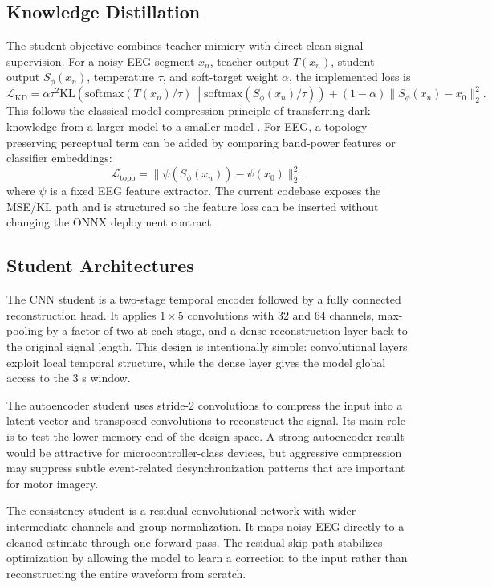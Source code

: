 \documentclass[11pt]{article}
\begin{document}
\subsection{Knowledge Distillation}

The student objective combines teacher mimicry with direct clean-signal supervision. For a noisy EEG segment \(x_n\), teacher output \(T(x_n)\), student output \(S_\phi(x_n)\), temperature \(\tau\), and soft-target weight \(\alpha\), the implemented loss is
\[
\mathcal{L}_{\mathrm{KD}} =
\alpha \tau^2 \mathrm{KL}
\left(
\mathrm{softmax}\left(T(x_n)/\tau\right)
\middle\|
\mathrm{softmax}\left(S_\phi(x_n)/\tau\right)
\right)
+ (1-\alpha)\|S_\phi(x_n)-x_0\|_2^2.
\]
This follows the classical model-compression principle of transferring dark knowledge from a larger model to a smaller model \cite{hinton2015distilling}. For EEG, a topology-preserving perceptual term can be added by comparing band-power features or classifier embeddings:
\[
\mathcal{L}_{\mathrm{topo}}=\|\psi(S_\phi(x_n))-\psi(x_0)\|_2^2,
\]
where \(\psi\) is a fixed EEG feature extractor. The current codebase exposes the MSE/KL path and is structured so the feature loss can be inserted without changing the ONNX deployment contract.

\subsection{Student Architectures}

The CNN student is a two-stage temporal encoder followed by a fully connected reconstruction head. It applies \(1 \times 5\) convolutions with 32 and 64 channels, max-pooling by a factor of two at each stage, and a dense reconstruction layer back to the original signal length. This design is intentionally simple: convolutional layers exploit local temporal structure, while the dense layer gives the model global access to the 3 s window.

The autoencoder student uses stride-2 convolutions to compress the input into a latent vector and transposed convolutions to reconstruct the signal. Its main role is to test the lower-memory end of the design space. A strong autoencoder result would be attractive for microcontroller-class devices, but aggressive compression may suppress subtle event-related desynchronization patterns that are important for motor imagery.

The consistency student is a residual convolutional network with wider intermediate channels and group normalization. It maps noisy EEG directly to a cleaned estimate through one forward pass. The residual skip path stabilizes optimization by allowing the model to learn a correction to the input rather than reconstructing the entire waveform from scratch.
\end{document}
